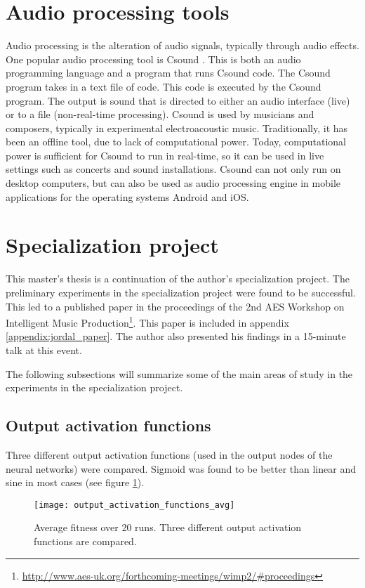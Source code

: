 \section{Audio processing tools}
Audio processing is the alteration of audio signals, typically through audio effects. One popular audio processing tool is Csound \citep{csound}. This is both an audio programming language and a program that runs Csound code. The Csound program takes in a text file of code. This code is executed by the Csound program. The output is sound that is directed to either an audio interface (live) or to a file (non-real-time processing). Csound is used by musicians and composers, typically in experimental electroacoustic music. Traditionally, it has been an offline tool, due to lack of computational power. Today, computational power is sufficient for Csound to run in real-time, so it can be used in live settings such as concerts and sound installations. Csound can not only run on desktop computers, but can also be used as audio processing engine in mobile applications for the operating systems Android and iOS.

\section{Specialization project}
This master's thesis is a continuation of the author's specialization project. The preliminary experiments in the specialization project were found to be successful. This led to a published paper in the proceedings of the 2nd AES Workshop on Intelligent Music Production\footnote{\url{http://www.aes-uk.org/forthcoming-meetings/wimp2/\#proceedings}}. This paper is included in appendix \ref{appendix:jordal_paper}. The author also presented his findings in a 15-minute talk at this event.

The following subsections will summarize some of the main areas of study in the experiments in the specialization project.

\subsection{Output activation functions}
Three different output activation functions (used in the output nodes of the neural networks) were compared. Sigmoid was found to be better than linear and sine in most cases (see figure \ref{fig:output_activation_functions_avg}).

\begin{figure}[H]
    \centering
    \texttt{[image: output\_activation\_functions\_avg]}
    \caption{Average fitness over 20 runs. Three different output activation functions are compared.}
    \label{fig:output_activation_functions_avg}
\end{figure}

